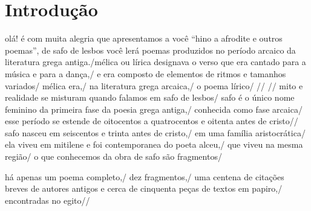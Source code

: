 \documentclass[12pt]{extarticle}
\begin{document}
\section{Introdução}

olá! é com muita alegria que apresentamos a você “hino a afrodite e outros poemas”, de safo de lesbos 
você lerá poemas produzidos no período arcaico da literatura grega antiga./mélica ou lírica designava o verso que era cantado para a
música e para a dança,/ e era composto de elementos de ritmos e tamanhos variados/
mélica era,/ na literatura grega arcaica,/ o poema lírico/
 //
//
mito e realidade se misturam quando falamos em safo de lesbos/
safo é o único nome feminino da primeira fase da poesia grega antiga,/ conhecida como fase arcaica/
esse período se estende de oitocentos a quatrocentos e oitenta antes de cristo//
safo nasceu em seiscentos e trinta antes de cristo,/ em uma família aristocrática/
ela viveu em mitilene e foi contemporanea do poeta alceu,/ que viveu na mesma região/
o que conhecemos da obra de safo são fragmentos/

há apenas um poema completo,/ dez fragmentos,/ uma centena de citações breves de autores antigos e cerca de cinquenta peças de textos em papiro,/ encontradas no egito//
\end{document}
